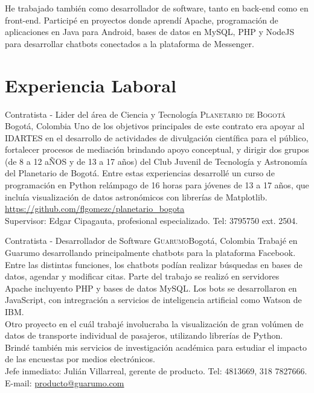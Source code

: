 \documentclass[12pt,letterpaper,sans]{moderncv}
\newcommand{\forceindent}{\leavevmode{\parindent=1em\indent}}
\begin{document}
\forceindent
He trabajado también como desarrollador de software, tanto en back-end como en front-end.
Participé en proyectos donde aprendí Apache, programación de aplicaciones en Java para
Android, bases de datos en MySQL, PHP y NodeJS para desarrollar chatbots conectados a la
plataforma de Messenger.
\par


\section{Experiencia Laboral}

        {Contratista - Lider del área de Ciencia y Tecnología}
        {\textsc{Planetario de Bogotá}}
        {Bogotá, Colombia}{}
        { Uno de los objetivos principales de este contrato era apoyar al IDARTES en el
          desarrollo de actividades de divulgación científica para el público, fortalecer
          procesos de mediación brindando apoyo conceptual, y dirigir dos grupos (de 8 a
          12 aÑOS y de 13 a 17 años) del Club Juvenil de Tecnología y Astronomía del
          Planetario de Bogotá. Entre estas experiencias desarrollé un curso de
          programación en Python relámpago de 16 horas para jóvenes de 13 a 17 años,
          que incluía visualización de datos astronómicos con librerías de Matplotlib.
          \url{https://github.com/flgomezc/planetario_bogota}
          \\
          Supervisor: Edgar Cipagauta, profesional especializado. Tel: 3795750 ext. 2504.
        }


        {Contratista - Desarrollador de Software}
        {\textsc{Guarumo}}{Bogotá, Colombia}{}
        { Trabajé en Guarumo desarrollando principalmente chatbots para la plataforma Facebook. Entre las
          distintas funciones, los chatbots podían realizar búsquedas en bases de datos,
          agendar y modificar citas. Parte del trabajo se realizó en servidores Apache incluyento
          PHP y bases de datos MySQL. Los bots se desarrollaron en JavaScript, con
          intregración a servicios de inteligencia artificial como Watson de IBM. \\
          Otro proyecto en el cuál trabajé
          involucraba la visualización de gran volúmen de datos de transporte individual de pasajeros,
          utilizando librerías de Python.\\
          Brindé también mis servicios de investigación académica para estudiar el impacto de las encuestas
          por medios electrónicos.\\
          Jefe inmediato: Julián Villarreal, gerente de producto. Tel: 4813669, 318 7827666. E-mail:
          \url{producto@guarumo.com}}
\end{document}
